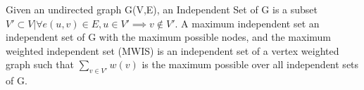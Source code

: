 Given an undirected graph G(V,E), an Independent Set of G is a subset $V' \subset V | \forall e(u,v) \in E, u \in V' \implies v \notin V'$. A maximum independent set an independent set of G with the maximum possible nodes, and the maximum weighted independent set (MWIS) is an independent set of a vertex weighted graph such that $\sum_{v \in V'} w(v)$ is the maximum possible over all independent sets of G.
